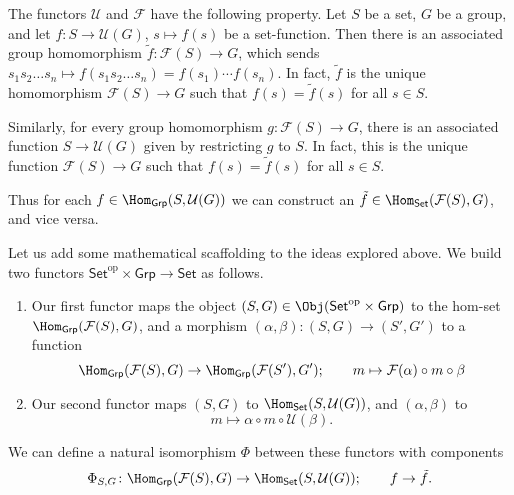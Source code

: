 \documentclass[main.tex]{subfiles}
\begin{document}
The functors $\mathcal{U}$ and $\mathcal{F}$ have the following property. Let $S$ be a set, $G$ be a group, and let $f\colon S \to \mathcal{U}(G)$, $s \mapsto f(s)$ be a set-function. Then there is an associated group homomorphism $\tilde{f}\colon \mathcal{F}(S) \to G$, which sends $s_{1}s_{2}\dots s_{n} \mapsto f(s_{1}s_{2}\dots s_{n}) = f(s_{1})\cdots f(s_{n})$. In fact, $\tilde{f}$ is the unique homomorphism $\mathcal{F}(S) \to G$ such that $f(s) = \tilde{f}(s)$ for all $s \in S$.

Similarly, for every group homomorphism $g\colon \mathcal{F}(S) \to G$, there is an associated function $S \to \mathcal{U}(G)$ given by restricting $g$ to $S$. In fact, this is the unique function $\mathcal{F}(S) \to G$ such that $f(s) = \tilde{f}(s)$ for all $s \in S$.

Thus for each $f \in \Hom_{\mathsf{Grp}}(S, \mathcal{U}(G))$ we can construct an $\tilde{f} \in \Hom_{\mathsf{Set}}(\mathcal{F}(S), G)$, and vice versa.

Let us add some mathematical scaffolding to the ideas explored above. We build two functors $\mathsf{Set}^{\mathrm{op}} \times \mathsf{Grp} \rightarrow \mathsf{Set}$ as follows.
\begin{enumerate}
  \item Our first functor maps the object $(S, G) \in \Obj(\mathsf{Set}^{\mathrm{op}} \times \mathsf{Grp})$ to the hom-set $\Hom_{\mathsf{Grp}}(\mathcal{F}(S), G)$, and a morphism $(\alpha, \beta)\colon (S,G) \to (S', G')$ to a function
    \begin{equation*}
      \Hom_{\mathsf{Grp}}(\mathcal{F}(S), G) \to \Hom_{\mathsf{Grp}}(\mathcal{F}(S'), G');\qquad m \mapsto \mathcal{F}(\alpha) \circ m \circ \beta
    \end{equation*}

  \item Our second functor maps $(S, G)$ to $\Hom_{\mathsf{Set}}(S, \mathcal{U}(G))$, and $(\alpha, \beta)$ to
    \begin{equation*}
      m \mapsto \alpha \circ m \circ \mathcal{U}(\beta).
    \end{equation*}
\end{enumerate}
We can define a natural isomorphism $\Phi$ between these functors with components
\begin{equation*}
  \Phi_{S, G}\colon \Hom_{\mathsf{Grp}}(\mathcal{F}(S), G) \to \Hom_{\mathsf{Set}}(S, \mathcal{U}(G));\qquad f \to \tilde{f}.
\end{equation*}
\end{document}
